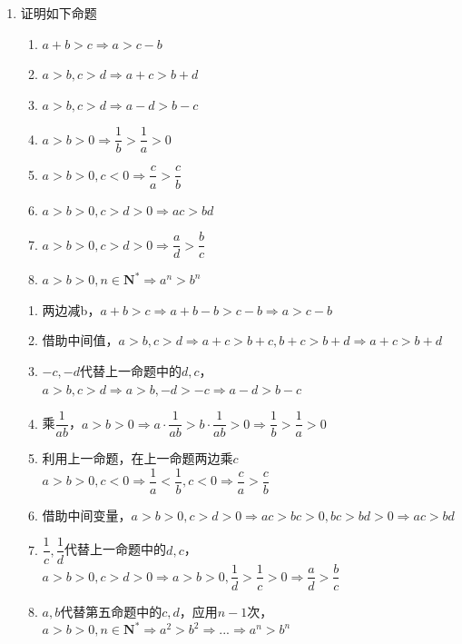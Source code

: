 \begin{enumerate}
    \item 证明如下命题
    \begin{enumerate}
        \item $a + b > c \Longrightarrow a > c - b$
        \item $a > b, c > d \Longrightarrow a + c > b + d$
        \item $a > b, c > d \Longrightarrow a - d > b - c$
        \item $a > b > 0 \Longrightarrow \dfrac{1}{b} > \dfrac{1}{a} > 0$
        \item $a > b > 0, c < 0 \Longrightarrow \dfrac{c}{a} > \dfrac{c}{b}$
        \item $a > b > 0, c > d > 0 \Longrightarrow ac > bd$
        \item $a > b > 0, c > d > 0 \Longrightarrow \dfrac{a}{d} > \dfrac{b}{c}$
        \item $a > b > 0, n \in \mathbf{N^*} \Longrightarrow a^n > b^n$
    \end{enumerate}
    \begin{jieda}
        \begin{enumerate}
            \item 两边减b，\quad $a + b > c \Longrightarrow a + b - b > c - b \Longrightarrow a > c - b$
            \item 借助中间值，\quad $a > b, c > d \Longrightarrow a + c > b + c, b + c > b + d \Longrightarrow a + c > b + d$
            \item $-c, -d$代替上一命题中的$d, c$，\quad $a > b, c > d \Longrightarrow a > b, -d > -c \Longrightarrow a - d > b - c$
            \item 乘$\dfrac{1}{ab}$，\quad $a > b > 0 \Longrightarrow a \cdot \dfrac{1}{ab} > b \cdot \dfrac{1}{ab} > 0\Longrightarrow \dfrac{1}{b} > \dfrac{1}{a} > 0$
            \item 利用上一命题，在上一命题两边乘$c$ \quad $a > b > 0, c < 0 \Longrightarrow \dfrac{1}{a} < \dfrac{1}{b}, c < 0 \Longrightarrow \dfrac{c}{a} > \dfrac{c}{b}$
            \item 借助中间变量，\quad $a > b > 0, c > d > 0 \Longrightarrow ac > bc > 0, bc > bd > 0 \Longrightarrow ac > bd$
            \item  $\dfrac{1}{c}, \dfrac{1}{d}$代替上一命题中的$d, c$，\quad $a > b > 0, c > d > 0 \Longrightarrow a > b > 0, \dfrac{1}{d} > \dfrac{1}{c} > 0 \Longrightarrow \dfrac{a}{d} > \dfrac{b}{c}$
            \item $a, b$代替第五命题中的$c, d$，应用$n-1$次，$a > b > 0, n \in \mathbf{N^*} \Longrightarrow a^2 > b^2 \Longrightarrow ... \Longrightarrow a^n > b^n$

\end{enumerate}
\end{jieda}
\end{enumerate}
